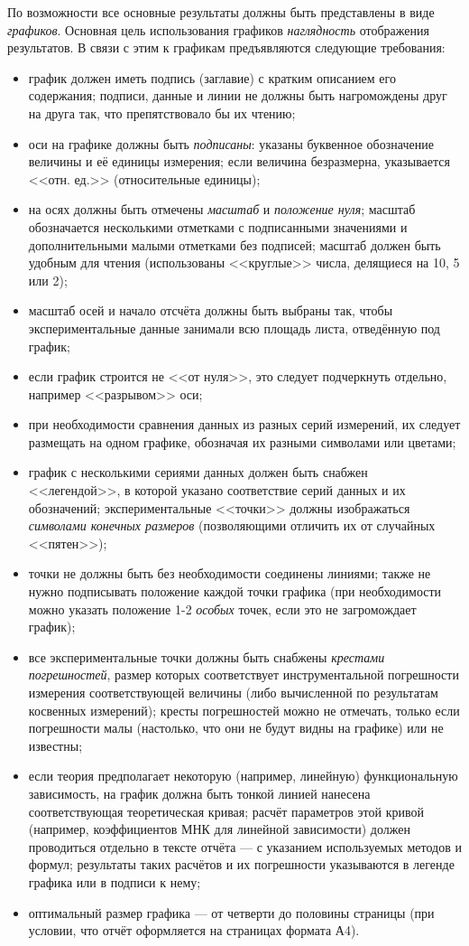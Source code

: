 По возможности все основные результаты должны быть представлены в
виде \emph{графиков}. Основная цель использования графиков \textendash{}
\emph{наглядность} отображения результатов. В связи с этим к графикам
предъявляются следующие требования:
\begin{itemize}
\item график должен иметь подпись (заглавие) с кратким описанием его содержания;
подписи, данные и линии не должны быть нагромождены друг на друга
так, что препятствовало бы их чтению;
\item оси на графике должны быть \emph{подписаны}: указаны буквенное обозначение
величины и её единицы измерения; если величина безразмерна, указывается
<<отн. ед.>> (относительные единицы); 
\item на осях должны быть отмечены \emph{масштаб} и \emph{положение нуля};
масштаб обозначается несколькими отметками с подписанными значениями
и дополнительными малыми отметками без подписей; масштаб должен быть
удобным для чтения (использованы <<круглые>>
числа, делящиеся на 10, 5 или 2);
\item масштаб осей и начало отсчёта должны быть выбраны так, чтобы экспериментальные
данные занимали всю площадь листа, отведённую под график;
\item если график строится не <<от нуля>>, это
следует подчеркнуть отдельно, например <<разрывом>>
оси; 
\item при необходимости сравнения данных из разных серий измерений, их следует
размещать на одном графике, обозначая их разными символами или цветами; 
\item график с несколькими сериями данных должен быть снабжен <<легендой>>,
в которой указано соответствие серий данных и их обозначений; экспериментальные
<<точки>> должны изображаться \emph{символами
конечных размеров} (позволяющими отличить их от случайных <<пятен>>); 
\item точки не должны быть без необходимости соединены линиями; также не
нужно подписывать положение каждой точки графика (при необходимости
можно указать положение 1-2 \emph{особых} точек, если это не загромождает
график);
\item все экспериментальные точки должны быть снабжены \emph{крестами погрешностей},
размер которых соответствует инструментальной погрешности измерения
соответствующей величины (либо вычисленной по результатам косвенных
измерений); кресты погрешностей можно не отмечать, только если погрешности
малы (настолько, что они не будут видны на графике) или не известны; 
\item если теория предполагает некоторую (например, линейную) функциональную
зависимость, на график должна быть тонкой линией нанесена соответствующая
теоретическая кривая; расчёт параметров этой кривой (например, коэффициентов
МНК для линейной зависимости) должен проводиться отдельно в тексте
отчёта --- с указанием используемых методов и формул; результаты
таких расчётов и их погрешности указываются в легенде графика или
в подписи к нему;
\item оптимальный размер графика --- от четверти до половины страницы
(при условии, что отчёт оформляется на страницах формата А4).
\end{itemize}
